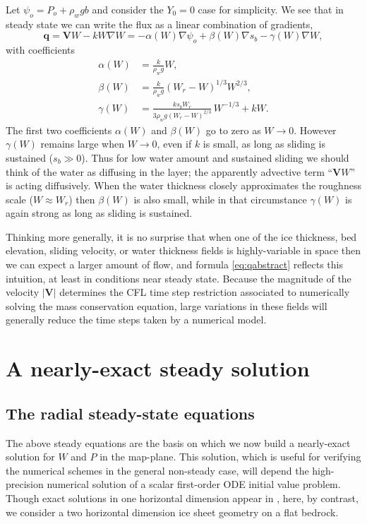 \documentclass[11pt,final]{amsart}
\newcommand\bV{\mathbf{V}}
\newcommand\bq{\mathbf{q}}
\newcommand{\grad}{\nabla}
\begin{document}
Let $\psi_o = P_o + \rho_w g b$ and consider the $Y_0=0$ case for simplicity.  We see that in steady state we can write the flux as a linear combination of gradients,
\begin{equation}
\bq = \bV W - k W \grad W = - \alpha(W) \grad \psi_o + \beta(W) \grad s_b - \gamma(W) \grad W,  \label{eq:qabstract}
\end{equation}
with coefficients
\begin{align*}
\alpha(W) &= \frac{k}{\rho_w g} W, \\
\beta(W) &= \frac{k}{\rho_w g} \left(W_r - W\right)^{1/3} W^{2/3}, \\
\gamma(W) &= \frac{k s_b W_r}{3 \rho_w g (W_r - W)^{2/3}}\, W^{-1/3} + k W.
\end{align*}
The first two coefficients $\alpha(W)$ and $\beta(W)$ go to zero as $W\to 0$.  However $\gamma(W)$ remains large when $W\to 0$, even if $k$ is small, as long as sliding is sustained ($s_b \gg 0$).  Thus for low water amount and sustained sliding we should think of the water as diffusing in the layer; the apparently advective term ``$\bV W$'' is acting diffusively.  When the water thickness closely approximates the roughness scale ($W\approx W_r$) then $\beta(W)$ is also small, while in that circumstance $\gamma(W)$ is again strong as long as sliding is sustained.

Thinking more generally, it is no surprise that when one of the ice thickness, bed elevation, sliding velocity, or water thickness fields is highly-variable in space then we can expect a larger amount of flow, and formula \eqref{eq:qabstract} reflects this intuition, at least in conditions near steady state.  Because the magnitude of the velocity $|\bV|$ determines the CFL time step restriction \citep{MortonMayers} associated to numerically solving the mass conservation equation, large variations in these fields will generally reduce the time steps taken by a numerical model.



\section{A nearly-exact steady solution}

\subsection*{The radial steady-state equations}  The above steady equations are the basis on which we now build a nearly-exact solution for $W$ and $P$ in the map-plane.  This solution, which is useful for verifying the numerical schemes in the general non-steady case, will depend the high-precision numerical solution of a scalar first-order ODE initial value problem.  Though exact solutions in one horizontal dimension appear in \cite{Schoofetal2012}, here, by contrast, we consider a two horizontal dimension ice sheet geometry on a flat bedrock.
\end{document}
